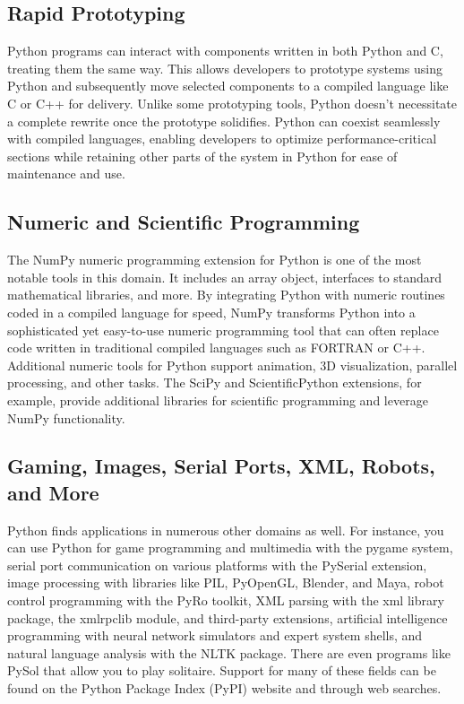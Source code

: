 \documentclass[12pt]{book}
\begin{document}
\subsection{Rapid Prototyping}

Python programs can interact with components written in both Python and C, treating them the same way. This allows developers to prototype systems using Python and subsequently move selected components to a compiled language like C or C++ for delivery. Unlike some prototyping tools, Python doesn't necessitate a complete rewrite once the prototype solidifies. Python can coexist seamlessly with compiled languages, enabling developers to optimize performance-critical sections while retaining other parts of the system in Python for ease of maintenance and use.

\subsection{Numeric and Scientific Programming}

The NumPy numeric programming extension for Python is one of the most notable tools in this domain. It includes an array object, interfaces to standard mathematical libraries, and more. By integrating Python with numeric routines coded in a compiled language for speed, NumPy transforms Python into a sophisticated yet easy-to-use numeric programming tool that can often replace code written in traditional compiled languages such as FORTRAN or C++. Additional numeric tools for Python support animation, 3D visualization, parallel processing, and other tasks. The SciPy and ScientificPython extensions, for example, provide additional libraries for scientific programming and leverage NumPy functionality.

\subsection{Gaming, Images, Serial Ports, XML, Robots, and More}

Python finds applications in numerous other domains as well. For instance, you can use Python for game programming and multimedia with the pygame system, serial port communication on various platforms with the PySerial extension, image processing with libraries like PIL, PyOpenGL, Blender, and Maya, robot control programming with the PyRo toolkit, XML parsing with the xml library package, the xmlrpclib module, and third-party extensions, artificial intelligence programming with neural network simulators and expert system shells, and natural language analysis with the NLTK package. There are even programs like PySol that allow you to play solitaire. Support for many of these fields can be found on the Python Package Index (PyPI) website and through web searches.
\end{document}
